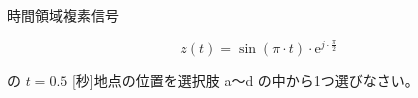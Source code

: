 時間領域複素信号 

\[
z(t) = \sin(\pi\cdot t) \cdot \textrm{e}^{ j \cdot \frac{\pi}{2} }
\]

\medskip
\noindent の $t = 0.5$ [秒]地点の位置を選択肢 a〜d の中から1つ選びなさい。
